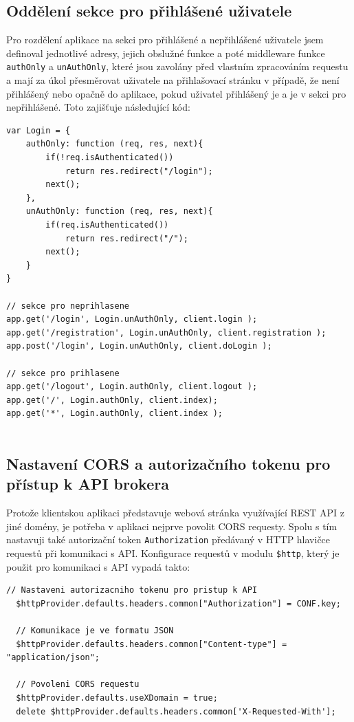 \documentclass[thesis=M,czech]{FITthesis}[2012/06/26]
\begin{document}
\subsection{Oddělení sekce pro přihlášené uživatele}
	
	Pro rozdělení aplikace na sekci pro přihlášené a nepřihlášené uživatele jsem definoval jednotlivé adresy, jejich obslužné funkce a poté middleware funkce \texttt{authOnly} a \texttt{unAuthOnly}, které jsou zavolány před vlastním zpracováním requestu a mají za úkol přesměrovat uživatele na přihlašovací stránku v případě, že není přihlášený nebo opačně do aplikace, pokud uživatel přihlášený je a je v sekci pro nepřihlášené. Toto zajišťuje následující kód:
	
\begin{lstlisting}[basicstyle={\tiny\ttfamily}, frame=single] 
var Login = {
    authOnly: function (req, res, next){
        if(!req.isAuthenticated())
            return res.redirect("/login");
        next();
    },
    unAuthOnly: function (req, res, next){
        if(req.isAuthenticated())
            return res.redirect("/");
        next();
    }
}

// sekce pro neprihlasene
app.get('/login', Login.unAuthOnly, client.login );
app.get('/registration', Login.unAuthOnly, client.registration );
app.post('/login', Login.unAuthOnly, client.doLogin );

// sekce pro prihlasene
app.get('/logout', Login.authOnly, client.logout );
app.get('/', Login.authOnly, client.index);
app.get('*', Login.authOnly, client.index );


\end{lstlisting}


\subsection{Nastavení CORS a autorizačního tokenu pro přístup k API brokera}
	
	Protože klientskou aplikaci představuje webová stránka využívající REST API z jiné domény, je potřeba v aplikaci nejprve povolit CORS requesty. Spolu s tím nastavuji také autorizační token \texttt{Authorization} předávaný v HTTP hlavičce requestů při komunikaci s API. Konfigurace requestů v modulu \texttt{\$http}, který je použit pro komunikaci s API vypadá takto:

\begin{lstlisting}[basicstyle={\tiny\ttfamily}, frame=single] 	
  // Nastaveni autorizacniho tokenu pro pristup k API
  $httpProvider.defaults.headers.common["Authorization"] = CONF.key;

  // Komunikace je ve formatu JSON
  $httpProvider.defaults.headers.common["Content-type"] = "application/json";

  // Povoleni CORS requestu
  $httpProvider.defaults.useXDomain = true;
  delete $httpProvider.defaults.headers.common['X-Requested-With'];

\end{lstlisting}
\end{document}
